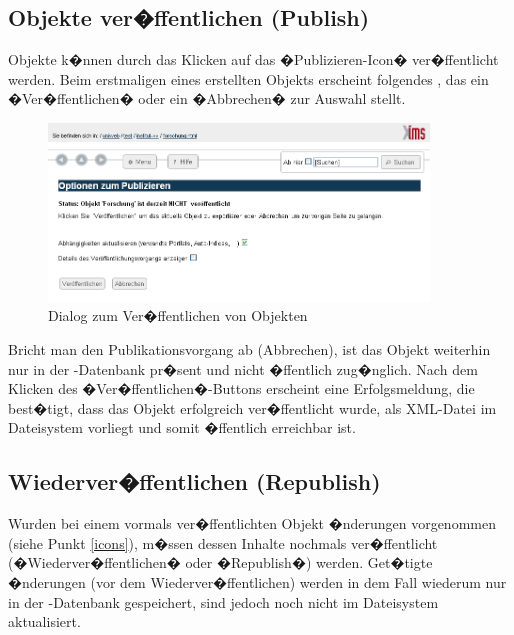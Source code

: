 \subsection{Objekte ver�ffentlichen (Publish)}
\label{publizieren}

Objekte k�nnen durch das Klicken auf das �Publizieren-Icon� ver�ffentlicht werden. Beim
erstmaligen  eines erstellten Objekts erscheint folgendes ,
das ein �Ver�ffentlichen� oder ein �Abbrechen� zur Auswahl stellt.

\begin{figure}[!ht]
	\centering
		\includegraphics[width=0.9\textwidth]{./images/XI5S-publish.png}
	\caption{Dialog zum Ver�ffentlichen von Objekten}
	\label{fig:xims-publish}
\end{figure}

Bricht man den Publikationsvorgang ab (Abbrechen), ist das Objekt weiterhin nur in
der -Datenbank pr�sent und nicht �ffentlich zug�nglich.
Nach dem Klicken des �Ver�ffentlichen�-Buttons erscheint eine Erfolgsmeldung,
die best�tigt, dass das Objekt erfolgreich ver�ffentlicht wurde, als XML-Datei im
Dateisystem vorliegt und somit �ffentlich erreichbar ist.

\subsection{Wiederver�ffentlichen (Republish)}
\label{republish}

Wurden bei einem vormals ver�ffentlichten Objekt �nderungen vorgenommen (siehe
Punkt \ref{icons}), m�ssen dessen Inhalte nochmals ver�ffentlicht
(�Wiederver�ffentlichen� oder �Republish�) werden. Get�tigte �nderungen (vor
dem Wiederver�ffentlichen) werden in dem Fall wiederum nur in der -Datenbank
gespeichert, sind jedoch noch nicht im Dateisystem aktualisiert.

